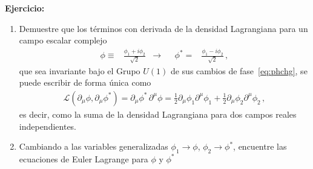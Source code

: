 \begin{frame}
\textbf{Ejercicio:}
\begin{enumerate}
\item  Demuestre que los términos con derivada de la densidad Lagrangiana para un campo escalar complejo
\begin{align}
  \phi\equiv&\frac{\phi_1+i\phi_2}{\sqrt{2}} &\to&&   \phi^{*}=&\frac{\phi_1-i\phi_2}{\sqrt{2}}\,,
\end{align}
que sea invariante bajo el Grupo $U(1)$ de sus cambios de fase~\eqref{eq:phchg}, se puede escribir de forma única como
\begin{align}
  \label{eq:kincmplx}
  \mathcal{L}(\partial_{\mu} \phi,\partial_{\mu} \phi^{*})=  {\partial_\mu\phi^{*}}\,{\partial^\mu\phi}=\frac{1}{2}\partial_{\mu}\phi_1 \partial^{\mu}\phi_1+\frac{1}{2}\partial_{\mu}\phi_2 \partial^{\mu}\phi_2\,,
\end{align}
es decir, como la suma de la densidad Lagrangiana para dos campos reales independientes.
\item Cambiando a las variables generalizadas $\phi_1\to \phi$, $\phi_2\to \phi^{*}$, encuentre las ecuaciones de Euler Lagrange para $\phi$ y $\phi^{*}$
\end{enumerate}
\end{frame}





